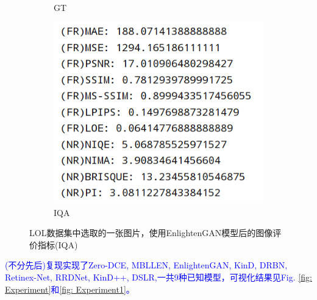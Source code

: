 \documentclass[a4paper]{ctexart}
\begin{document}
\begin{figure}[htb]
\begin{subfigure}{0.19\textwidth}
				\captionsetup{font=scriptsize}
				\caption{GT}
				\label{fig: GT}
			\end{subfigure}
			\begin{subfigure}{0.19\textwidth}
				\includegraphics[width=\linewidth]{picture/LLIE/EnlightenGAN/Index}
				\captionsetup{font=scriptsize}
				\caption{IQA}
				\label{fig:IQA}
			\end{subfigure}
			\caption{
				\label{fig: IQA Index}
				LOL数据集中选取的一张图片，使用EnlightenGAN模型后的图像评价指标(IQA)
			}
		\end{figure}
		
		\textcolor{blue}{(不分先后)复现实现了Zero-DCE\cite{guo2020zero}, MBLLEN\cite{lv2018mbllen}, EnlightenGAN\cite{jiang2021enlightengan}, KinD\cite{zhang2019kindling}, DRBN\cite{yang2020fidelity}, Retinex-Net\cite{wei2018deep}, RRDNet\cite{zhu2020zero}, KinD++\cite{zhang2021beyond}, DSLR\cite{lim2020dslr},一共9种已知模型，可视化结果见Fig. \ref{fig: Experiment}和\ref{fig: Experiment1}。}
	
\end{document}
